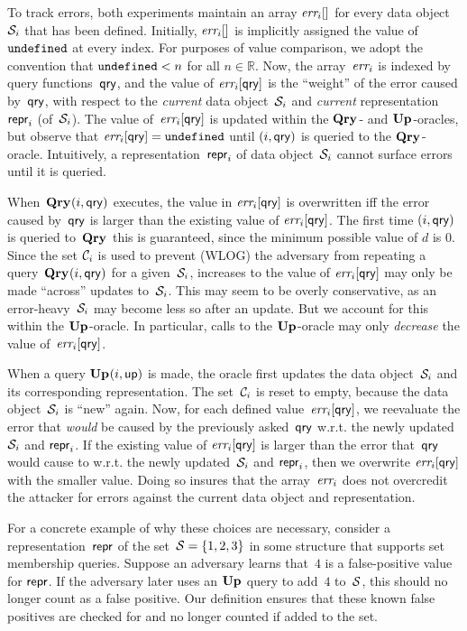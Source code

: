 To track errors, both experiments maintain an array $\textit{err}_i[]$ for every data
object~$\mathcal{S}_i$ that has been defined.   Initially, $\textit{err}_i[]$ is implicitly
assigned the value of~$\mathtt{undefined}$ at every index.  For purposes of value
comparison, we adopt the convention that $\mathtt{undefined} < n$ for all $n \in
\mathbb{R}$.
%
Now, the array~$\textit{err}_i$ is indexed by query functions~$\mathsf{qry}$, and the value of
$\textit{err}_i[\mathsf{qry}]$ is the ``weight'' of the error caused by~$\mathsf{qry}$, with respect to
the \emph{current} data object~$\mathcal{S}_i$ and \emph{current}
representation~$\mathsf{repr}_i$ (of~$\mathcal{S}_i$).
%
The value of~$\textit{err}_i[\mathsf{qry}]$ is updated within the $\textup{\textbf{Qry}}\hspace{0.5pt}$- and $\textup{\textbf{Up}}\hspace{0.5pt}$-oracles,
but observe that $\textit{err}_i[\mathsf{qry}] = \mathtt{undefined}$ until $(i,\mathsf{qry})$ is queried to the
$\textup{\textbf{Qry}}\hspace{0.5pt}$-oracle.  Intuitively, a representation~$\mathsf{repr}_i$ of data object~$\mathcal{S}_i$
cannot surface errors until it is queried.

When~$\textup{\textbf{Qry}}\hspace{0.5pt}(i,\mathsf{qry})$ executes, the value in $\textit{err}_i[\mathsf{qry}]$ is overwritten iff
the error caused by~$\mathsf{qry}$ is larger than the existing value of $\textit{err}_i[\mathsf{qry}]$.
The first time $(i,\mathsf{qry})$ is queried to~$\textup{\textbf{Qry}}\hspace{0.5pt}$ this is guaranteed, since the
minimum possible value of $d$ is 0.  Since the set $\mathcal{C}_i$ is used to prevent
(WLOG) the adversary from repeating a query~$\textup{\textbf{Qry}}\hspace{0.5pt}(i,\mathsf{qry})$ for a
given~$\mathcal{S}_i$, increases to the value of $\textit{err}_i[\mathsf{qry}]$ may only be made
``across'' updates to~$\mathcal{S}_i$.  This may seem to be overly conservative, as an
error-heavy~$\mathcal{S}_i$ may become less so after an update.  But we account for
this within the $\textup{\textbf{Up}}\hspace{0.5pt}$-oracle.  In particular, calls to the $\textup{\textbf{Up}}\hspace{0.5pt}$-oracle may
only \emph{decrease} the value of~$\textit{err}_i[\mathsf{qry}]$.

When a query $\textup{\textbf{Up}}\hspace{0.5pt}(i,\mathsf{up})$ is made, the oracle first updates the data
object~$\mathcal{S}_i$ and its corresponding representation.  The set~$\mathcal{C}_i$ is
reset to empty, because the data object~$\mathcal{S}_i$ is ``new'' again.
%
Now, for each defined value~$\textit{err}_i[\mathsf{qry}]$, we reevaluate the error that
\emph{would} be caused by the previously asked~$\mathsf{qry}$ w.r.t. the newly updated
$\mathcal{S}_i$ and $\mathsf{repr}_i$.  If the existing value of $\textit{err}_i[\mathsf{qry}]$ is larger than
the error that~$\mathsf{qry}$ would cause to w.r.t. the newly updated~$\mathcal{S}_i$ and
$\mathsf{repr}_i$, then we overwrite $\textit{err}_i[\mathsf{qry}]$ with the smaller value.  Doing so
insures that the array~$\textit{err}_i$ does not overcredit the attacker for errors
against the current data object and representation.

For a concrete example of why these choices are necessary, consider a
representation~$\mathsf{repr}$ of the set~$\mathcal{S} = \{1,2,3\}$ in some structure that
supports set membership queries. Suppose an adversary learns that~$4$ is a
false-positive value for $\mathsf{repr}$. If the adversary later uses an $\textup{\textbf{Up}}\hspace{0.5pt}$ query to
add~$4$ to~$\mathcal{S}$, this should no longer count as a false positive. Our
definition ensures that these known false positives are checked for and no
longer counted if added to the set.


